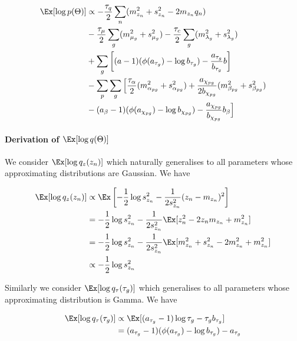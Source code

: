 \begin{equation}
\begin{aligned}
\Ex[\log p(\Theta)] & \propto - \frac{\tau_q}{2}\sum_n (m_{z_n}^2 + s_{z_n}^2 - 2 m_{z_n} q_n) \\
& -\frac{\tau_\mu}{2} \sum_g (m_{\mu_g}^2 +  s_{\mu_g}^2)  - \frac{\tau_c}{2} \sum_g (m_{\lambda_g}^2 + s_{\lambda_g}^2) \\
& + \sum_g \left[ (a-1)(\phi(a_{\tau_g}) - \log b_{\tau_g}) - \frac{a_{\tau_g}}{b_{\tau_g}} b \right] \\
& - \sum_p \sum_g \Big[ \frac{\tau_\alpha}{2} (m_{\alpha_{pg}}^2 + s_{\alpha_{pg}}^2) + \frac{a_{\chi_{pg}}}{2 b_{\chi_{pg}}} (m_{\beta_{pg}}^2 + s_{\beta_{pg}}^2) \\
& - (a_\beta - 1) (\phi(a_{\chi_{pg}}) - \log b_{\chi_{pg}} ) - \frac{a_{\chi_{pg}}}{b_{\chi_{pg}}} b_\beta \Big]
\end{aligned}
\end{equation}

\paragraph{Derivation of $\Ex[\log q(\Theta)]$}

We consider $\Ex[\log q_z (z_n)]$ which naturally generalises to all parameters whose approximating distributions are Gaussian. We have

\begin{equation}
\begin{aligned}
\Ex[\log q_z(z_n)] & \propto \Ex\left[ -\frac{1}{2} \log s_{z_n}^2 - \frac{1}{2 s_{z_n}^2} (z_n - m_{z_n})^2\right] \\
& = -\frac{1}{2} \log s_{z_n}^2 - \frac{1}{2 s_{z_n}^2} \Ex[ z_n^2 - 2 z_n m_{z_n} + m_{z_n}^2 ] \\
& = -\frac{1}{2} \log s_{z_n}^2 - \frac{1}{2 s_{z_n}^2} \Ex[ m_{z_n}^2 + s_{z_n}^2 - 2 m_{z_n}^2 + m_{z_n}^2 ] \\
& \propto-\frac{1}{2} \log s_{z_n}^2
\end{aligned}
\end{equation}

Similarly we consider $\Ex[\log q_\tau(\tau_g)]$ which generalises to all parameters whose approximating distribution is Gamma. We have

\begin{equation}
\begin{aligned}
\Ex[\log q_\tau(\tau_g)] & \propto \Ex[(a_{\tau_g} - 1) \log \tau_g - \tau_g b_{\tau_g} ] \\
& = (a_{\tau_g} - 1)(\phi(a_{\tau_g}) - \log b_{\tau_g}) - a_{\tau_g}
\end{aligned}
\end{equation}


